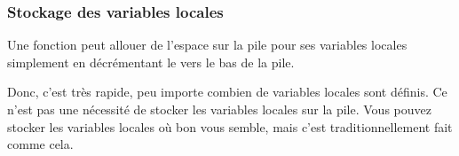 \subsubsection{Stockage des variables locales}

Une fonction peut allouer de l'espace sur la pile pour ses variables locales
simplement en décrémentant le  vers le
bas de la pile.


Donc, c'est très rapide, peu importe combien de variables locales sont définis.
Ce n'est pas une nécessité de stocker les variables locales sur la pile.
Vous pouvez stocker les variables locales où bon vous semble,
mais c'est traditionnellement fait comme cela.
